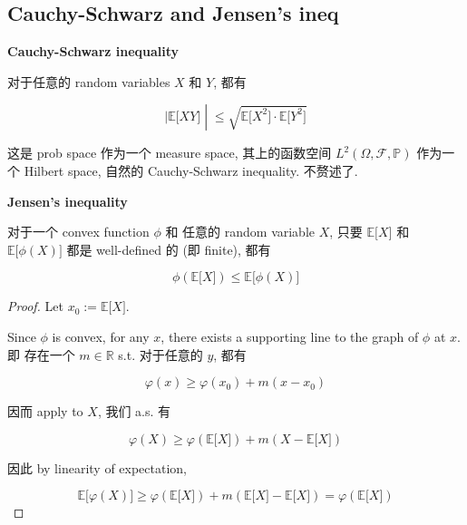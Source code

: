 \documentclass{qlnotes-export}
\begin{document}
\subsection{Cauchy-Schwarz and Jensen's ineq}\label{cauchy-schwarz-and-jensens-ineq}

\begin{theorem}{\protect{}\label{kn-cauchy-schwarz-inequality}{\textbf{Cauchy-Schwarz
inequality}}}

对于任意的 random variables \(X\) 和 \(Y\), 都有

\[\left. |{\mathbb{E}}\lbrack XY\rbrack \middle| \leq \sqrt{{\mathbb{E}}\lbrack X^{2}\rbrack \cdot {\mathbb{E}}\lbrack Y^{2}\rbrack} \right.\]

\end{theorem}

这是 prob space 作为一个 measure space, 其上的函数空间 \(L^{2}(\Omega,\mathcal{F},{\mathbb{P}})\) 作为一个 Hilbert space, 自然的 Cauchy-Schwarz inequality. 不赘述了.

\begin{theorem}{\protect{}\label{kn-jensen-inequality}{\textbf{Jensen's
inequality}}}

对于一个 convex function \(\phi\) 和 任意的 random variable \(X\), 只要 \({\mathbb{E}}\lbrack X\rbrack\) 和 \({\mathbb{E}}\lbrack\phi(X)\rbrack\) 都是 well-defined 的 (即 finite), 都有

\[\phi({\mathbb{E}}\lbrack X\rbrack) \leq {\mathbb{E}}\lbrack\phi(X)\rbrack\]

\end{theorem}

\begin{proof}

Let \(x_{0} := {\mathbb{E}}\lbrack X\rbrack\).

Since \(\phi\) is convex, for any \(x\), there exists a supporting line to the graph of \(\phi\) at \(x\). 即 存在一个 \(m \in {\mathbb{R}}\) s.t. 对于任意的 \(y\), 都有

\[\varphi(x) \geq \varphi\left( x_{0} \right) + m\left( {x - x_{0}} \right)\]

因而 apply to \(X\), 我们 a.s. 有

\[\varphi(X) \geq \varphi({\mathbb{E}}\lbrack X\rbrack) + m(X - {\mathbb{E}}\lbrack X\rbrack)\]

因此 by linearity of expectation,

\[{\mathbb{E}}\lbrack\varphi(X)\rbrack \geq \varphi({\mathbb{E}}\lbrack X\rbrack) + m({\mathbb{E}}\lbrack X\rbrack - {\mathbb{E}}\lbrack X\rbrack) = \varphi({\mathbb{E}}\lbrack X\rbrack)\]

\end{proof}
\end{document}
